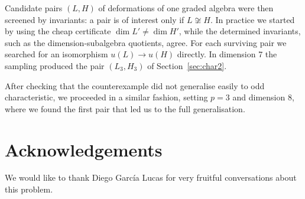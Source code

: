 \documentclass[11pt,reqno]{amsart}
\theoremstyle{plain}
\theoremstyle{remark}
\begin{document}
Candidate pairs $(L,H)$ of deformations of one graded algebra were then
screened by invariants: a pair is of interest only if $L\not\cong H$. In
practice we started by using the cheap certificate $\dim L'\neq\dim H'$, while the determined invariants, such
as the dimension-subalgebra quotients, agree. For each surviving pair we
searched for an isomorphism $u(L)\to u(H)$ directly. In dimension 7 the
sampling produced the pair $(L_3,H_3)$ of Section~\ref{sec:char2}. 

After checking that the counterexample did not generalise easily to odd characteristic, we proceeded in a similar fashion,
setting $p=3$ and dimension 8, where we found the first pair that led us to the full generalisation.

\section*{Acknowledgements}
We would like to thank Diego García Lucas for very fruitful conversations about this problem.
\end{document}
